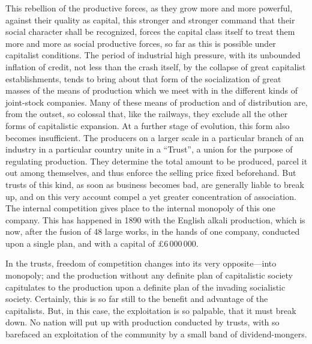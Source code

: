 This rebellion of the productive forces, as they grow more and more powerful,
against their quality as capital, this stronger and stronger command that their
social character shall be recognized, forces the capital class itself to treat
them more and more as social productive forces, so far as this is possible under
capitalist conditions. The period of industrial high pressure, with its
unbounded inflation of credit, not less than the crash itself, by the collapse
of great capitalist establishments, tends to bring about that form of the
socialization of great masses of the means of production which we meet with in
the different kinds of joint-stock companies. Many of these means of production
and of distribution are, from the outset, so colossal that, like the railways,
they exclude all the other forms of capitalistic expansion. At a further stage
of evolution, this form also becomes insufficient. The producers on a larger
scale in a particular branch of an industry in a particular country unite in a
``Trust'', a union for the purpose of regulating production. They determine the
total amount to be produced, parcel it out among themselves, and thus enforce
the selling price fixed beforehand. But trusts of this kind, as soon as business
becomes bad, are generally liable to break up, and on this very account compel a
yet greater concentration of association. The internal competition gives place
to the internal monopoly of this one company. This has happened in 1890 with the
English alkali production, which is now, after the fusion of 48 large works, in
the hands of one company, conducted upon a single plan, and with a capital of
£6\,000\,000.

In the trusts, freedom of competition changes into its very opposite---into
monopoly; and the production without any definite plan of capitalistic society
capitulates to the production upon a definite plan of the invading socialistic
society. Certainly, this is so far still to the benefit and advantage of the
capitalists. But, in this case, the exploitation is so palpable, that it must
break down. No nation will put up with production conducted by trusts, with so
barefaced an exploitation of the community by a small band of dividend-mongers. 

